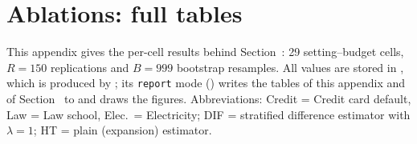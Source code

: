\section{Ablations: full tables}
\label{sec:app-ablations}\label{si:ablation-tables}

This appendix gives the per-cell results behind Section~: 29 setting--budget cells, $R=150$ replications and $B=999$ bootstrap resamples. All values are stored in
, which is produced by ; its \texttt{report} mode () writes the tables of this appendix and of Section~ to  and draws the figures. Abbreviations: Credit = Credit card default, Law = Law school, Elec.\ = Electricity; DIF = stratified difference estimator with $\lambda=1$; HT = plain (expansion) estimator.

